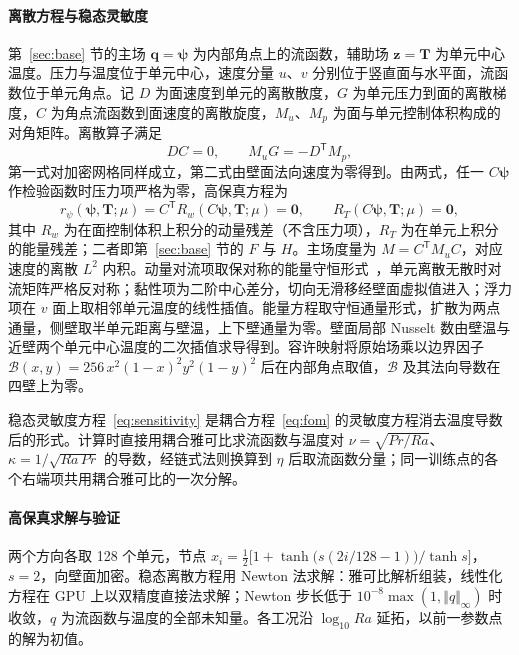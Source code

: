 \paragraph{离散方程与稳态灵敏度}
第~\ref{sec:base} 节的主场 $\mathbf q=\boldsymbol\psi$ 为内部角点上的流函数，辅助场 $\mathbf z=\mathbf T$ 为单元中心温度。压力与温度位于单元中心，速度分量 $u$、$v$ 分别位于竖直面与水平面，流函数位于单元角点。记 $D$ 为面速度到单元的离散散度，$G$ 为单元压力到面的离散梯度，$C$ 为角点流函数到面速度的离散旋度，$M_u$、$M_p$ 为面与单元控制体积构成的对角矩阵。离散算子满足
\begin{equation}
DC=0,\qquad M_uG=-D^{\mathsf T}M_p ,
\end{equation}
第一式对加密网格同样成立，第二式由壁面法向速度为零得到。由两式，任一 $C\boldsymbol\psi$ 作检验函数时压力项严格为零，高保真方程为
\begin{equation}
r_\psi(\boldsymbol\psi,\mathbf T;\mu)=C^{\mathsf T}R_w(C\boldsymbol\psi,\mathbf T;\mu)=\mathbf 0,\qquad
R_T(C\boldsymbol\psi,\mathbf T;\mu)=\mathbf 0,
\label{eq:fom}
\end{equation}
其中 $R_w$ 为在面控制体积上积分的动量残差（不含压力项），$R_T$ 为在单元上积分的能量残差；二者即第~\ref{sec:base} 节的 $F$ 与 $H$。主场度量为 $M=C^{\mathsf T}M_uC$，对应速度的离散 $L^2$ 内积。动量对流项取保对称的能量守恒形式~\cite{verstappen2003symmetry}，单元离散无散时对流矩阵严格反对称；黏性项为二阶中心差分，切向无滑移经壁面虚拟值进入；浮力项在 $v$ 面上取相邻单元温度的线性插值。能量方程取守恒通量形式，扩散为两点通量，侧壁取半单元距离与壁温，上下壁通量为零。壁面局部 Nusselt 数由壁温与近壁两个单元中心温度的二次插值求导得到。容许映射将原始场乘以边界因子 $\mathcal B(x,y)=256\,x^2(1-x)^2y^2(1-y)^2$ 后在内部角点取值，$\mathcal B$ 及其法向导数在四壁上为零。

稳态灵敏度方程~\eqref{eq:sensitivity} 是耦合方程~\eqref{eq:fom} 的灵敏度方程消去温度导数后的形式。计算时直接用耦合雅可比求流函数与温度对 $\nu=\sqrt{Pr/Ra}$、$\kappa=1/\sqrt{Ra\,Pr}$ 的导数，经链式法则换算到 $\eta$ 后取流函数分量；同一训练点的各个右端项共用耦合雅可比的一次分解。

\paragraph{高保真求解与验证}
两个方向各取 128 个单元，节点 $x_i=\tfrac12\bigl[1+\tanh\bigl(s(2i/128-1)\bigr)/\tanh s\bigr]$，$s=2$，向壁面加密。稳态离散方程用 Newton 法求解：雅可比解析组装，线性化方程在 GPU 上以双精度直接法求解；Newton 步长低于 $10^{-8}\max(1,\Vert q\Vert_\infty)$ 时收敛，$q$ 为流函数与温度的全部未知量。各工况沿 $\log_{10}Ra$ 延拓，以前一参数点的解为初值。

